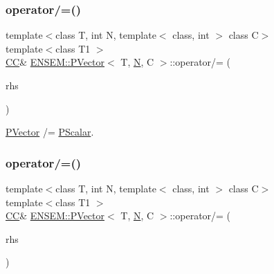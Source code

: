 \subsubsection{\texorpdfstring{operator/=()}{operator/=()}\hspace{0.1cm}{\footnotesize\ttfamily [1/3]}}
{\footnotesize\ttfamily template$<$class T, int N, template$<$ class, int $>$ class C$>$ \\
template$<$class T1 $>$ \\
\mbox{\hyperlink{classENSEM_1_1PVector_a92dc0a0a301a3dc96f7be5d337019bc7}{CC}}\& \mbox{\hyperlink{classENSEM_1_1PVector}{E\+N\+S\+E\+M\+::\+P\+Vector}}$<$ T, \mbox{\hyperlink{adat__devel_2lib_2hadron_2operator__name__util_8cc_a7722c8ecbb62d99aee7ce68b1752f337}{N}}, C $>$\+::operator/= (\begin{DoxyParamCaption}\item[{const \mbox{\hyperlink{classENSEM_1_1PScalar}{P\+Scalar}}$<$ T1 $>$ \&}]{rhs }\end{DoxyParamCaption})\hspace{0.3cm}{\ttfamily [inline]}}



\mbox{\hyperlink{classENSEM_1_1PVector}{P\+Vector}} /= \mbox{\hyperlink{classENSEM_1_1PScalar}{P\+Scalar}}. 

\mbox{\label{classENSEM_1_1PVector_a0da5cf65327a7044128b9a36a49b94e6}} 
\subsubsection{\texorpdfstring{operator/=()}{operator/=()}\hspace{0.1cm}{\footnotesize\ttfamily [2/3]}}
{\footnotesize\ttfamily template$<$class T, int N, template$<$ class, int $>$ class C$>$ \\
template$<$class T1 $>$ \\
\mbox{\hyperlink{classENSEM_1_1PVector_a92dc0a0a301a3dc96f7be5d337019bc7}{CC}}\& \mbox{\hyperlink{classENSEM_1_1PVector}{E\+N\+S\+E\+M\+::\+P\+Vector}}$<$ T, \mbox{\hyperlink{adat__devel_2lib_2hadron_2operator__name__util_8cc_a7722c8ecbb62d99aee7ce68b1752f337}{N}}, C $>$\+::operator/= (\begin{DoxyParamCaption}\item[{const \mbox{\hyperlink{classENSEM_1_1PScalar}{P\+Scalar}}$<$ T1 $>$ \&}]{rhs }\end{DoxyParamCaption})\hspace{0.3cm}{\ttfamily [inline]}}



